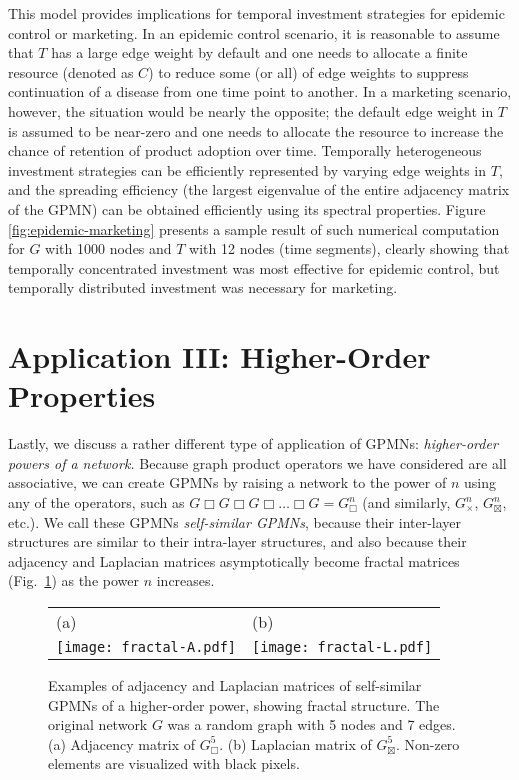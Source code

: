 \documentclass{article}
\DeclareMathOperator*{\CP}{\Box}
\DeclareMathOperator*{\DP}{\times}
\DeclareMathOperator*{\SP}{\boxtimes}
\begin{document}
This model provides implications for temporal investment strategies
for epidemic control or marketing. In an epidemic control scenario, it
is reasonable to assume that $T$ has a large edge weight by default
and one needs to allocate a finite resource (denoted as $C$) to reduce
some (or all) of edge weights to suppress continuation of a disease
from one time point to another. In a marketing scenario, however, the
situation would be nearly the opposite; the default edge weight in $T$
is assumed to be near-zero and one needs to allocate the resource to
increase the chance of retention of product adoption over
time. Temporally heterogeneous investment strategies can be
efficiently represented by varying edge weights in $T$, and the
spreading efficiency (the largest eigenvalue of the entire adjacency
matrix of the GPMN) can be obtained efficiently using its spectral
properties. Figure \ref{fig:epidemic-marketing} presents a sample
result of such numerical computation for $G$ with 1000 nodes and $T$
with 12 nodes (time segments), clearly showing that temporally
concentrated investment was most effective for epidemic control, but
temporally distributed investment was necessary for marketing.

\section{Application III: Higher-Order Properties}
\label{sec:app3}

Lastly, we discuss a rather different type of application of GPMNs:
{\em higher-order powers of a network.} Because graph product
operators we have considered are all associative, we can create GPMNs
by raising a network to the power of $n$ using any of the operators,
such as $G \CP G \CP G \CP \ldots \CP G = G^n_{\CP}$ (and similarly,
$G^n_{\DP}$, $G^n_{\SP}$, etc.). We call these GPMNs {\em self-similar
  GPMNs}, because their inter-layer structures are similar to their
intra-layer structures, and also because their adjacency and Laplacian
matrices asymptotically become fractal matrices
(Fig.~\ref{fig:fractal-matrices}) as the power $n$ increases.

\begin{figure}
\centering
\begin{tabular}{ll}
(a) & (b)\\
\texttt{[image: fractal-A.pdf]} &
\texttt{[image: fractal-L.pdf]} 
\end{tabular}
\caption{Examples of adjacency and Laplacian matrices of self-similar
  GPMNs of a higher-order power, showing fractal structure. The
  original network $G$ was a random graph with 5 nodes and 7
  edges. (a) Adjacency matrix of $G^5_{\CP}$. (b) Laplacian matrix of
  $G^5_{\SP}$. Non-zero elements are visualized with black pixels.}
\label{fig:fractal-matrices}
\end{figure}
\end{document}
